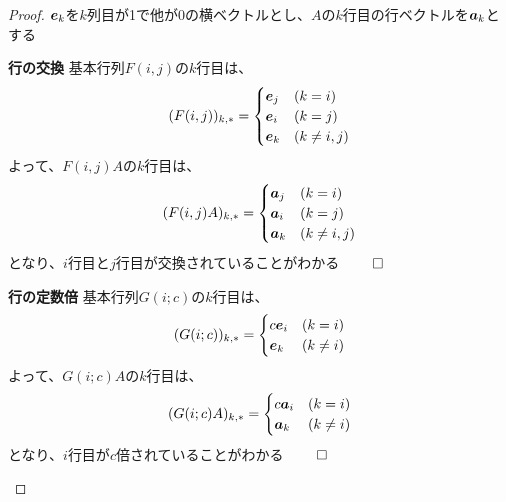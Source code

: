 \documentclass[../../../topic_linear-algebra]{subfiles}
\begin{document}
\begin{proof}
  $\vb*{e}_k$を$k$列目が1で他が0の横ベクトルとし、$A$の$k$行目の行ベクトルを$\vb*{a}_k$とする

  \begin{subpattern}{\bfseries 行の交換}
    基本行列$F(i,j)$の$k$行目は、
    \begin{equation*}
      (F(i,j))_{k,*} = \begin{cases}
        \vb*{e}_j & (k=i)        \\
        \vb*{e}_i & (k=j)        \\
        \vb*{e}_k & (k \neq i,j)
      \end{cases}
    \end{equation*}
    よって、$F(i,j)A$の$k$行目は、
    \begin{equation*}
      (F(i,j)A)_{k,*} = \begin{cases}
        \vb*{a}_j & (k=i)        \\
        \vb*{a}_i & (k=j)        \\
        \vb*{a}_k & (k \neq i,j)
      \end{cases}
    \end{equation*}
    となり、$i$行目と$j$行目が交換されていることがわかる $\qed$
  \end{subpattern}

  \begin{subpattern}{\bfseries 行の定数倍}
    基本行列$G(i;c)$の$k$行目は、
    \begin{equation*}
      (G(i;c))_{k,*} = \begin{cases}
        c \vb*{e}_i & (k=i)      \\
        \vb*{e}_k   & (k \neq i)
      \end{cases}
    \end{equation*}
    よって、$G(i;c)A$の$k$行目は、
    \begin{equation*}
      (G(i;c)A)_{k,*} = \begin{cases}
        c \vb*{a}_i & (k=i)      \\
        \vb*{a}_k   & (k \neq i)
      \end{cases}
    \end{equation*}
    となり、$i$行目が$c$倍されていることがわかる $\qed$
  \end{subpattern}


\end{proof}
\end{document}
